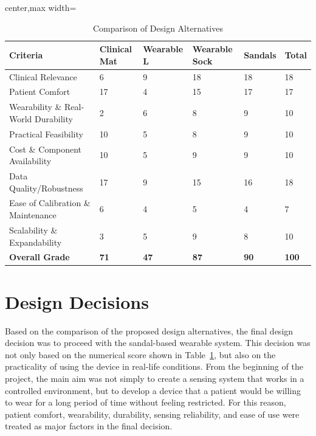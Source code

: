 \begin{table}[H]
\centering
\footnotesize
\caption{Comparison of Design Alternatives}
\label{tab:CDA}
\renewcommand{\arraystretch}{1.2}

\begin{adjustbox}{center,max width=\textwidth}
\begin{tabular}{p{2.5cm}p{2.5cm}p{2.5cm}p{2.5cm}p{2.5cm}p{1.5cm}}
\hline
\textbf{Criteria} & \textbf{Clinical Mat} & \textbf{Wearable L} & \textbf{Wearable Sock} &
\textbf{Sandals} &
\textbf{Total} \\ \hline
Clinical Relevance & 6 & 9 & 18 & 18 & 18 \\
Patient Comfort & 17 & 4 & 15 & 17 & 17 \\
Wearability \& Real-World Durability & 2 & 6 & 8 & 9 & 10 \\
Practical Feasibility & 10 & 5 & 8 & 9 & 10 \\
Cost \& Component Availability & 10 & 5 & 9 & 9 & 10 \\
Data Quality/Robustness & 17 & 9 & 15 & 16 & 18 \\
Ease of Calibration \& Maintenance & 6 & 4 & 5 & 4 & 7 \\
Scalability \& Expandability & 3 & 5 & 9 & 8 & 10 \\
\hline
\textbf{Overall Grade} & \textbf{71} & \textbf{47} & \textbf{87} & \textbf{90} & \textbf{100} \\
\hline
\end{tabular}
\end{adjustbox}

\end{table}

\section{Design Decisions} 
Based on the comparison of the proposed design alternatives, the final design decision was to proceed with the sandal-based wearable system. This decision was not only based on the numerical score shown in Table~\ref{tab:CDA}, but also on the practicality of using the device in real-life conditions. From the beginning of the project, the main aim was not simply to create a sensing system that works in a controlled environment, but to develop a device that a patient would be willing to wear for a long period of time without feeling restricted. For this reason, patient comfort, wearability, durability, sensing reliability, and ease of use were treated as major factors in the final decision. \\

